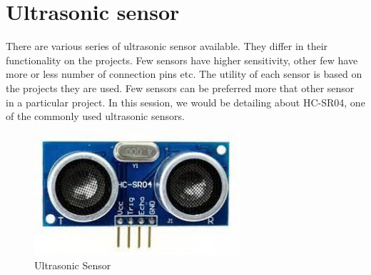 \section{Ultrasonic sensor}
There are various series of ultrasonic sensor available. They differ in their functionality on the projects. Few sensors have higher sensitivity, other few have more or less number of connection pins etc. The utility of each sensor is based on the projects they are used. Few sensors can be preferred more that other sensor in a particular project. In this session, we would be detailing about HC-SR04,  one of the commonly used ultrasonic sensors.
\begin{figure}
    \centering
    \includegraphics[width=3in]{Chapters/images/ultraSonic_board.png}
    \caption{Ultrasonic Sensor}
\end{figure}

